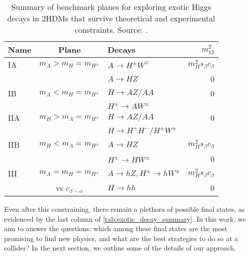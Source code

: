 \begin{table}
  \begin{tabular}{lclr}
    \toprule
    Name    & Plane                   & Decays                                    & $m_{12}^2$\\\midrule
    IA      & $m_A > m_H = m_{H^\pm}$ & $A\rightarrow H^\pm W^\mp$                & $m_H^2s_\beta c_\beta$\\
            &                         & $A\rightarrow HZ$                         & 0 \\\midrule
    IB      & $m_A < m_H = m_{H^\pm}$ & $H\rightarrow AZ/AA$                      & 0\\
            &                         & $H^\pm\rightarrow AW^\pm$                 & \\\midrule
    IIA     & $m_H > m_A = m_{H^\pm}$ & $H\rightarrow AZ/AA$                      & 0\\
            &                         & $H\rightarrow H^+H^-/H^\pm W^\pm$         & \\\midrule
    IIB     & $m_H < m_A = m_{H^\pm}$ & $A\rightarrow HZ$                         & $m_H^2s_\beta c_\beta$\\
            &                         & $H^\pm\rightarrow HW^\pm$                 & 0 \\\midrule
    III     & $m_A = m_H = m_{H^\pm}$ & $A\rightarrow hZ,H^\pm\rightarrow hW^\pm$ & $m_H^2s_\beta c_\beta$\\
            & vs $c_{\beta-\alpha}$   & $H\rightarrow hh$                         & 0 \\
    \bottomrule
  \end{tabular}
  \caption{Summary of benchmark planes for exploring exotic Higgs decays in 2HDMs that survive theoretical and experimental constraints. Source: \cite{Kling2016}.}
  \label{tab:benchmark_planes}
\end{table}

Even after this constraining, there remain a plethora of possible final states, as evidenced by the last column of \autoref{tab:exotic_decay_summary}. In this work, we aim to answer the questions: which among these final states are the most promising to find new physics, and what are the best strategies to do so at a collider? In the next section, we outline some of the details of our approach.

